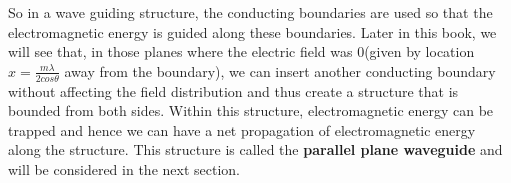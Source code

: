 So in a wave guiding structure, the conducting boundaries are used so that the electromagnetic energy is guided along these boundaries. Later in this book, we will see that, in those planes where the electric field was $0$(given by location $x = \frac{m\lambda}{2cos\theta}$ away from the boundary), we can insert another conducting boundary without affecting the field distribution and thus create a structure that is bounded from both sides. Within this structure, electromagnetic energy can be trapped and hence we can have a net propagation of electromagnetic energy along the structure. This structure is called the \textbf{parallel plane waveguide}  and will be considered in the next section.